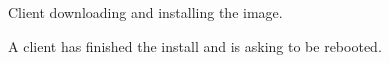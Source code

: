 \begin{figure}[h!]
  \begin{center}
    \centerline{
      }
    \caption{Client downloading and installing the image.}
    \label{fig:sbs-install-rsync}
  \end{center}
\end{figure}

\begin{figure}[h!]
  \begin{center}
    \centerline{
      }
    \caption{A client has finished the install and is asking to be
      rebooted.} 
    \label{fig:sbs-install-finish}
  \end{center}
\end{figure}



